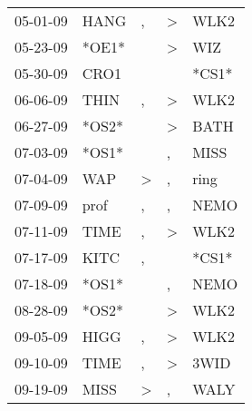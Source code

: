\begin{supertabular}{p{0.07\textwidth}p{0.06\textwidth}p{0.02\textwidth}p{0.02\textwidth}p{0.06\textwidth}}
          05-01-09\textsuperscript{} &           HANG\textsuperscript{} &                , &  \textgreater &           WLK2\textsuperscript{} \\
          05-23-09\textsuperscript{} &                            *OE1* &                  &  \textgreater &            WIZ\textsuperscript{} \\
          05-30-09\textsuperscript{} &           CRO1\textsuperscript{} &                  &               &                            *CS1* \\
          06-06-09\textsuperscript{} &           THIN\textsuperscript{} &                , &  \textgreater &           WLK2\textsuperscript{} \\
          06-27-09\textsuperscript{} &                            *OS2* &                  &  \textgreater &           BATH\textsuperscript{} \\
          07-03-09\textsuperscript{} &                            *OS1* &                  &             , &           MISS\textsuperscript{} \\
          07-04-09\textsuperscript{} &            WAP\textsuperscript{} &     \textgreater &             , &           ring\textsuperscript{} \\
          07-09-09\textsuperscript{} &           prof\textsuperscript{} &                , &             , &           NEMO\textsuperscript{} \\
          07-11-09\textsuperscript{} &           TIME\textsuperscript{} &                , &  \textgreater &           WLK2\textsuperscript{} \\
          07-17-09\textsuperscript{} &           KITC\textsuperscript{} &                , &               &                            *CS1* \\
          07-18-09\textsuperscript{} &                            *OS1* &                  &             , &           NEMO\textsuperscript{} \\
          08-28-09\textsuperscript{} &                            *OS2* &                  &  \textgreater &           WLK2\textsuperscript{} \\
          09-05-09\textsuperscript{} &           HIGG\textsuperscript{} &                , &  \textgreater &           WLK2\textsuperscript{} \\
          09-10-09\textsuperscript{} &           TIME\textsuperscript{} &                , &  \textgreater &           3WID\textsuperscript{} \\
          09-19-09\textsuperscript{} &           MISS\textsuperscript{} &     \textgreater &             , &           WALY\textsuperscript{} \\

\end{supertabular}

